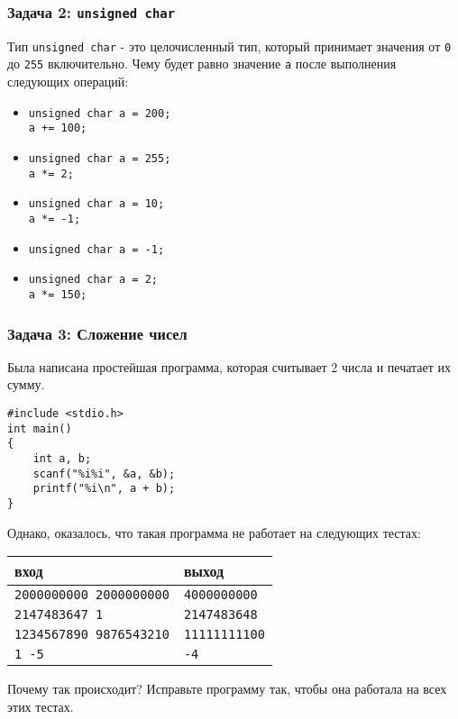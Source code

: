 \documentclass{article}
\begin{document}
\subsubsection*{Задача 2: \texttt{unsigned char}}
Тип \texttt{unsigned char} - это целочисленный тип, который принимает значения от \texttt{0} до \texttt{255} включительно.
Чему будет равно значение \texttt{a} после выполнения следующих операций:
\begin{itemize}
\item 
\begin{verbatim}
unsigned char a = 200;
a += 100;
\end{verbatim}
\item
\begin{verbatim}
unsigned char a = 255;
a *= 2;
\end{verbatim}
\item
\begin{verbatim}
unsigned char a = 10;
a *= -1;
\end{verbatim}
\item
\begin{verbatim}
unsigned char a = -1;
\end{verbatim}
\item
\begin{verbatim}
unsigned char a = 2;
a *= 150;
\end{verbatim}
\end{itemize}


\subsubsection*{Задача 3: Сложение чисел}
Была написана простейшая программа, которая считывает 2 числа и печатает их сумму.
\begin{lstlisting}
#include <stdio.h>
int main() 
{
	int a, b;
	scanf("%i%i", &a, &b);
	printf("%i\n", a + b);
}
\end{lstlisting}
Однако, оказалось, что такая программа не работает на следующих тестах:
\begin{center}
\begin{tabular}{ l l }
 вход & выход \\ \hline
 \texttt{2000000000 2000000000} & \texttt{4000000000}  \\ 
 \texttt{2147483647 1} & \texttt{2147483648}  \\
 \texttt{1234567890 9876543210} & \texttt{11111111100} \\
 \texttt{1 -5} & \texttt{-4} \\
\end{tabular}
\end{center}
Почему так происходит? Исправьте программу так, чтобы она работала на всех этих тестах. \\
\end{document}
